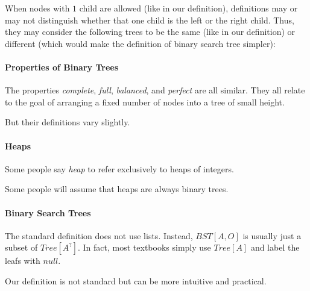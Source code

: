 When nodes with $1$ child are allowed (like in our definition), definitions may or may not distinguish whether that one child is the left or the right child.
Thus, they may consider the following trees to be the same (like in our definition) or different (which would make the definition of binary search tree simpler):

\begin{center}
\tb
{}
\end{center}

\paragraph{Properties of Binary Trees}
The properties \emph{complete}, \emph{full}, \emph{balanced}, and \emph{perfect} are all similar.
They all relate to the goal of arranging a fixed number of nodes into a tree of small height.

But their definitions vary slightly.

\paragraph{Heaps}
Some people say \emph{heap} to refer exclusively to heaps of integers.

Some people will assume that heaps are always binary trees.

\paragraph{Binary Search Trees}
The standard definition does not use lists.
Instead, $BST[A,O]$ is usually just a subset of $Tree[A^?]$.
In fact, most textbooks simply use $Tree[A]$ and label the leafs with $null$.

Our definition is not standard but can be more intuitive and practical.

